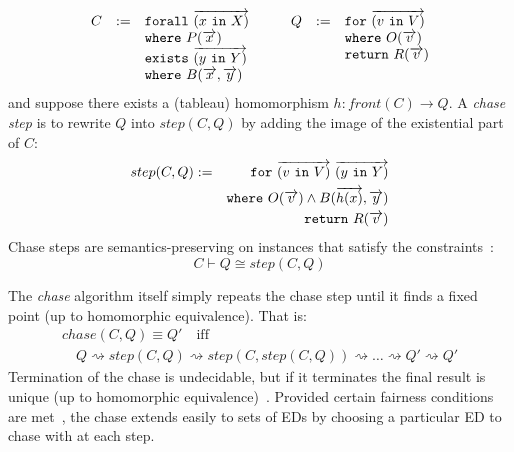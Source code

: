 \documentclass[preprint]{sigplanconf}
\newcommand{\FOR}{{\tt for} \ }
\newcommand{\FORALL}{{\tt forall} \ }
\newcommand{\EXISTS}{{\tt exists} \ }
\newcommand{\WHERE}{{\tt where} \ }
\newcommand{\IN}{ \ {\tt in} \ }
\newcommand{\RETURN}{{\tt return} \ }
\begin{document}
\[
\begin{array}{ccc} %
\begin{array}[t]{rcl}
 C & := & \FORALL \overrightarrow{(x \IN X)} \\
 & & \WHERE P(\overrightarrow{x}) \\
 & & \EXISTS \overrightarrow{(y \IN Y)} \\
 & & \WHERE B(\overrightarrow{x}, \overrightarrow{y})
\end{array} & &
\begin{array}[t]{rcl}
Q & := & \FOR \overrightarrow{(v \IN V)} \\
 & & \WHERE  O(\overrightarrow{v}) \\ 
 & & \RETURN R(\overrightarrow{v})
\end{array}
\end{array}
\]
and suppose there exists a (tableau) homomorphism $h : front(C) \to Q$.  A {\it chase step} is to rewrite $Q$ into $step(C,Q)$ by adding the image of the existential part of $C$:
\begin{eqnarray*}
step(C,Q) & := & \FOR \overrightarrow{(v \IN V)} \ \overrightarrow{(y \IN Y)} \\
 & & \WHERE  O(\overrightarrow{v}) \wedge B(\overrightarrow{h(x)}, \overrightarrow{y}) 
\\
 & & \RETURN R(\overrightarrow{v})
\end{eqnarray*}
Chase steps are semantics-preserving on instances that satisfy the constraints~\cite{Popa99anequational}:
\[
C \vdash Q \cong step(C,Q)
\]

The {\it chase} algorithm itself simply repeats the chase step until it finds a fixed point (up to homomorphic equivalence).
That is:
\[\begin{array}{l}
chase(C,Q) \equiv Q' \quad \textrm{iff} \\
\quad Q \rightsquigarrow step(C, Q) \rightsquigarrow step(C, step(C, Q)) \rightsquigarrow \ldots \rightsquigarrow Q' \rightsquigarrow Q'
\end{array}
\]
Termination of the chase is undecidable, but if it terminates the final result is unique (up to homomorphic equivalence)~\cite{Deutsch:2006:QRC:1121995.1122010}.  Provided certain fairness conditions are met~\cite{Deutsch:2006:QRC:1121995.1122010}, the chase extends easily to sets of EDs by choosing a particular ED to chase with at each step.
\end{document}

